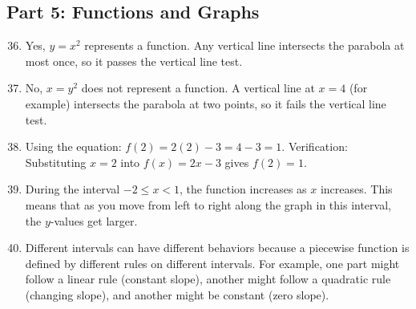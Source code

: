 \documentclass[12pt]{article}
\begin{document}
\subsection*{Part 5: Functions and Graphs}

\begin{enumerate}
\setcounter{enumi}{35}

\item Yes, $y = x^2$ represents a function. Any vertical line intersects the parabola at most once, so it passes the vertical line test.

\item No, $x = y^2$ does not represent a function. A vertical line at $x = 4$ (for example) intersects the parabola at two points, so it fails the vertical line test.

\item Using the equation: $f(2) = 2(2) - 3 = 4 - 3 = 1$. Verification: Substituting $x = 2$ into $f(x) = 2x - 3$ gives $f(2) = 1$. 

\item During the interval $-2 \leq x < 1$, the function increases as $x$ increases. This means that as you move from left to right along the graph in this interval, the $y$-values get larger.

\item Different intervals can have different behaviors because a piecewise function is defined by different rules on different intervals. For example, one part might follow a linear rule (constant slope), another might follow a quadratic rule (changing slope), and another might be constant (zero slope).

\end{enumerate}
\end{document}
